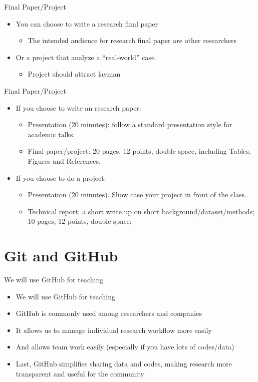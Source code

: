 \documentclass[handout]{beamer}
\begin{document}
\begin{frame}[label={h:e849f823-9751-4b8d-aa48-036ac7303852}]{Final Paper/Project}
\begin{itemize}
\item You can choose to write a research final paper
\begin{itemize}
\item The intended audience for research final paper are other \alert{researchers}
\end{itemize}
\item Or a project that analyze a ``real-world'' case.
\begin{itemize}
\item Project should attract \alert{layman}
\end{itemize}
\end{itemize}
\end{frame}

\begin{frame}[label={h:562a25b7-63d6-4465-9895-dba8a85c5d35}]{Final Paper/Project}
\begin{itemize}
\item If you choose to write an research paper:
\begin{itemize}
\item Presentation (\alert{20 minutes}): follow a standard presentation style for academic talks.
\item Final paper/project: \alert{20 pages, 12 points, double space, including Tables, Figures and References}.
\end{itemize}
\item If you choose to do a project:
\begin{itemize}
\item Presentation (\alert{20 minutes}). Show case your project in front of the class.
\item Technical report: a short write up on short background/dataset/methods; \alert{10 pages, 12 points, double space};
\end{itemize}
\end{itemize}
\end{frame}

\section{Git and GitHub}
\label{h:65ad84f2-01da-4fa6-8c04-bc0440de0511}
\begin{frame}[label={h:9f385451-0bf7-4d13-b71a-1baecb2a18d3}]{We will use GitHub for teaching}
\begin{itemize}
\item We will use GitHub for teaching
\item GitHub is commonly used among researchers and companies
\item It allows us to manage individual research workflow more easily
\item And allows team work easily (especially if you have lots of codes/data)
\item Last, GitHub simplifies sharing data and codes, making research more transparent and useful for the community
\end{itemize}
\end{frame}
\end{document}
